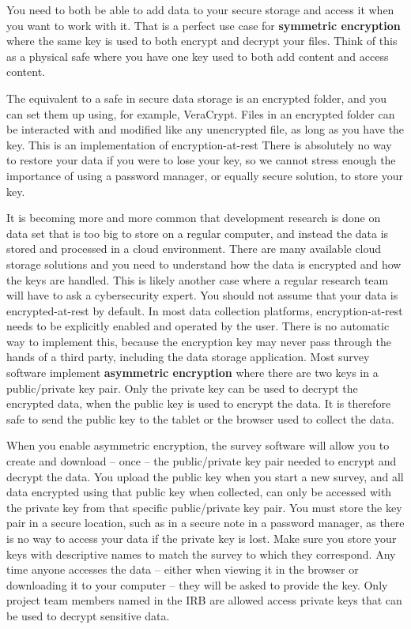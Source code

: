 You need to both be able to add data to your secure storage
and access it when you want to work with it.
That is a perfect use case for \textbf{symmetric encryption} 
where the same key is used to both encrypt and decrypt your files.
Think of this as a physical safe where you have one key 
used to both add content and access content.

The equivalent to a safe in secure data storage is an encrypted folder,
and you can set them up using, for example, VeraCrypt.
Files in an encrypted folder can be interacted with and modified like any unencrypted file,
as long as you have the key.
This is an implementation of encryption-at-rest
There is absolutely no way to restore your data if you were to lose your key, 
so we cannot stress enough the importance of using a password manager,
or equally secure solution, to store your key.

It is becoming more and more common that development research
is done on data set that is too big to store on a regular computer,
and instead the data is stored and processed in a cloud environment. 
There are many available cloud storage solutions
and you need to understand how the data is encrypted and how the keys are handled.
This is likely another case where a regular research team will have to ask a cybersecurity expert.
You should not assume that your data is encrypted-at-rest by default.
In most data collection platforms,
encryption-at-rest needs to be explicitly enabled and operated by the user.
There is no automatic way to implement this,
because the encryption key may
never pass through the hands of a third party,
including the data storage application.
Most survey software implement \textbf{asymmetric encryption}
where there are two keys in a public/private key pair.
Only the private key can be used to decrypt the encrypted data,
when the public key is used to encrypt the data.
It is therefore safe to send the public key
to the tablet or the browser used to collect the data.

When you enable asymmetric encryption, the survey software will allow you to create and
download -- once -- the public/private key pair needed to encrypt and decrypt the data.
You upload the public key when you start a new survey, 
and all data encrypted using that public key when collected, 
can only be accessed with the private key from that specific public/private key pair.
You must store the key pair in a secure location, 
such as in a secure note in a password manager,
as there is no way to access your data if the private key is lost.
Make sure you store your keys with descriptive names to match the survey to which they correspond.
Any time anyone accesses the data --
either when viewing it in the browser or downloading it to your computer --
they will be asked to provide the key.
Only project team members named in the IRB are allowed access private keys 
that can be used to decrypt sensitive data.

